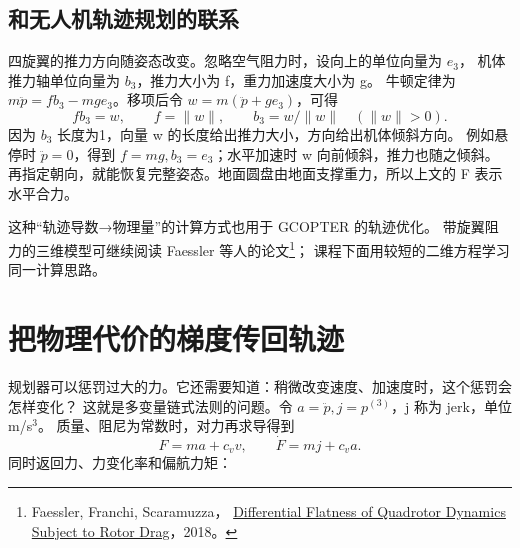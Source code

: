 \subsection*{和无人机轨迹规划的联系}
四旋翼的推力方向随姿态改变。忽略空气阻力时，设向上的单位向量为 $e_3$，
机体推力轴单位向量为 $b_3$，推力大小为 f，重力加速度大小为 g。
牛顿定律为 $m\ddot p=f b_3-mg e_3$。移项后令 $w=m(\ddot p+g e_3)$，可得
\begin{equation}
f b_3=w,\qquad f=\|w\|,\qquad b_3=w/\|w\|\quad(\|w\|>0).
\end{equation}
因为 $b_3$ 长度为1，向量 w 的长度给出推力大小，方向给出机体倾斜方向。
例如悬停时 $\ddot p=0$，得到 $f=mg,b_3=e_3$；水平加速时 w 向前倾斜，推力也随之倾斜。
再指定朝向，就能恢复完整姿态。地面圆盘由地面支撑重力，所以上文的 F 表示水平合力。

这种“轨迹导数→物理量”的计算方式也用于 GCOPTER 的轨迹优化。
带旋翼阻力的三维模型可继续阅读 Faessler 等人的论文\footnote{Faessler, Franchi, Scaramuzza，
\href{https://arxiv.org/abs/1712.02402}{Differential Flatness of Quadrotor Dynamics Subject to Rotor Drag}，2018。}；
课程下面用较短的二维方程学习同一计算思路。

\section{把物理代价的梯度传回轨迹}
规划器可以惩罚过大的力。它还需要知道：稍微改变速度、加速度时，这个惩罚会怎样变化？
这就是多变量链式法则的问题。令 $a=\ddot p,j=p^{(3)}$，j 称为 jerk，单位 m/s$^3$。
质量、阻尼为常数时，对力再求导得到
\begin{equation}
F=ma+c_vv,\qquad \dot F=mj+c_va.
\end{equation}
 同时返回力、力变化率和偏航力矩：
\par\noindent\begin{minipage}{\linewidth}

\end{minipage}\par

